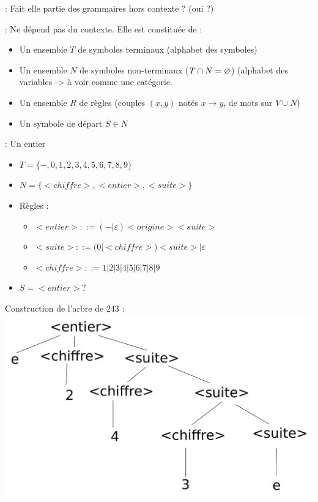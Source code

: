  : Fait elle partie des grammaires hors contexte ? (oui ?)

\newpage

 : Ne dépend pas du contexte. Elle est constituée de : 
\begin{itemize}
	\item Un ensemble $T$ de symboles terminaux (alphabet des symboles)
	\item Un ensemble $N$ de symboles non-terminaux ($T\cap N =\varnothing$) (alphabet des variables -> à voir comme une catégorie.
	\item Un ensemble $R$ de règles (couples $(x,y)$ notés $x \rightarrow y$, de mots sur $V\cup N$) 
	\item Un symbole de départ $S\in N$
\end{itemize}

 : Un entier 
\begin{itemize}
	\item $T = \{-,0,1,2,3,4,5,6,7,8,9\}$
	\item $N = \{<chiffre>,<entier>,<suite>\}$
	\item Règles : \begin{itemize}
		\item $<entier> ::= (-|\varepsilon) <origine><suite>$ 
		\item $<suite> ::= (0|<chiffre>)<suite> | \varepsilon$
		\item $<chiffre> ::= 1|2|3|4|5|6|7|8|9$
		\end{itemize}
	\item $S = <entier>?$
\end{itemize}
Construction de l'arbre de $243$ :\\
\includegraphics[width=\linewidth]{fig1_graphe_BNF_entier.pdf}


